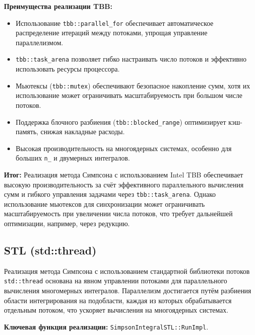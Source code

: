 \documentclass[12pt]{article}
\begin{document}
\textbf{Преимущества реализации TBB:}
\begin{itemize}
  \item Использование \texttt{tbb::parallel\_for} обеспечивает автоматическое распределение итераций между потоками, упрощая управление параллелизмом.
  \item \texttt{tbb::task\_arena} позволяет гибко настраивать число потоков и эффективно использовать ресурсы процессора.
  \item Мьютексы (\texttt{tbb::mutex}) обеспечивают безопасное накопление сумм, хотя их использование может ограничивать масштабируемость при большом числе потоков.
  \item Поддержка блочного разбиения (\texttt{tbb::blocked\_range}) оптимизирует кэш-память, снижая накладные расходы.
  \item Высокая производительность на многоядерных системах, особенно для больших \texttt{n\_} и двумерных интегралов.
\end{itemize}

\textbf{Итог:} Реализация метода Симпсона с использованием Intel TBB обеспечивает высокую производительность за счёт эффективного параллельного вычисления сумм и гибкого управления задачами через \texttt{tbb::task\_arena}. Однако использование мьютексов для синхронизации может ограничивать масштабируемость при увеличении числа потоков, что требует дальнейшей оптимизации, например, через редукцию.

\subsection{STL (std::thread)}

Реализация метода Симпсона с использованием стандартной библиотеки потоков \texttt{std::thread} основана на явном управлении потоками для параллельного вычисления многомерных интегралов. Параллелизм достигается путём разбиения области интегрирования на подобласти, каждая из которых обрабатывается отдельным потоком, что ускоряет вычисления на многоядерных системах.

\textbf{Ключевая функция реализации:} \texttt{SimpsonIntegralSTL::RunImpl}.
\end{document}

